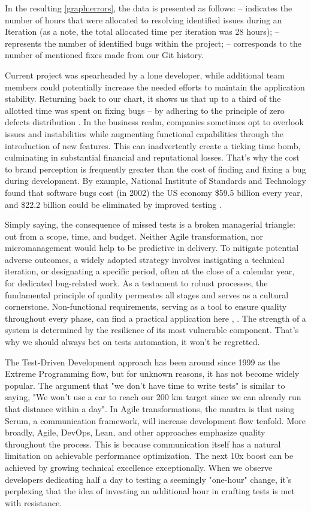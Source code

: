 \noindent In the resulting \cref{graph:errors}, the data is presented as follows:
 -- indicates the number of hours that were allocated to resolving identified issues during an Iteration (as a 
note, the total allocated time per iteration was 28 hours);
 -- represents the number of identified bugs within the project;
 -- corresponds to the number of mentioned fixes made from our Git history.

Current project was spearheaded by a lone developer, while additional team members could potentially increase 
the needed efforts \cite{Alm21} to maintain the application stability. Returning back to our chart, it shows us 
that up to a third of the allotted time was spent on fixing bugs -- by adhering to the principle of zero 
defects distribution \cite{Allan98}. In the business realm, companies sometimes opt to overlook issues and instabilities 
while augmenting functional capabilities through the introduction of new features. This can inadvertently create a ticking 
time bomb, culminating in substantial financial and reputational losses. That's why the cost to brand perception is 
frequently greater than the cost of finding and fixing a bug during development. By example, National Institute of 
Standards and Technology found that software bugs cost (in 2002) the US economy \$59.5 billion every year, and 
\$22.2 billion could be eliminated by improved testing \cite{RTI02}.

Simply saying, the consequence of missed tests is a broken managerial triangle: out from a scope, time, and budget.
Neither Agile transformation, nor micromanagement would help to be predictive in delivery. To mitigate potential adverse 
outcomes, a widely adopted strategy involves instigating a technical iteration, or designating a specific period, often 
at the close of a calendar year, for dedicated bug-related work. As a testament to robust processes, the fundamental 
principle of quality permeates all stages and serves as a cultural cornerstone. Non-functional requirements, serving 
as a tool to ensure quality throughout every phase, can find a practical application here \cite{Sam17}, \cite{Suz12}. 
The strength of a system is determined by the resilience of its most vulnerable component. That's why we should always 
bet on tests automation, it won't be regretted.

The Test-Driven Development approach has been around since 1999 as the Extreme Programming flow, but for unknown 
reasons, it has not become widely popular. The argument that "we don't have time to write tests" is similar to saying, 
"We won't use a car to reach our 200 km target since we can already run that distance within a day". In 
Agile transformations, the mantra is that using Scrum, a communication framework, will increase development flow 
tenfold. More broadly, Agile, DevOps, Lean, and other approaches emphasize quality throughout the process. This is 
because communication itself has a natural limitation on achievable performance optimization. The next 10x boost can be 
achieved by growing technical excellence exceptionally. When we observe developers dedicating half a day to testing a 
seemingly "one-hour" change, it's perplexing that the idea of investing an additional hour in crafting tests is met with 
resistance.

